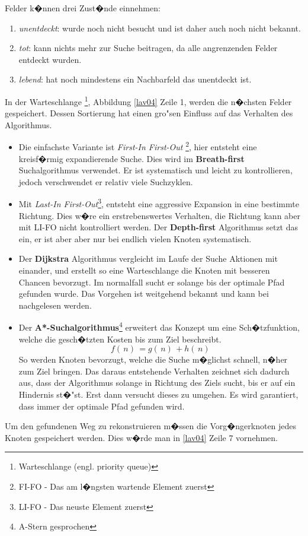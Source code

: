 Felder k�nnen drei Zust�nde einnehmen:
\begin{enumerate}

\item \textit{unentdeckt}: wurde noch nicht besucht und ist daher auch noch nicht bekannt.
\item \textit{tot}: kann nichts mehr zur Suche beitragen, da alle angrenzenden Felder entdeckt wurden.
\item \textit{lebend}: hat noch mindestens ein Nachbarfeld das unentdeckt ist.  
\end{enumerate} \cite[~S. 33]{Lav06}


In der Warteschlange \footnote{Warteschlange (engl. priority queue)}, Abbildung \ref{lav04} Zeile 1, werden die n�chsten Felder gespeichert. Dessen Sortierung hat einen gro"sen Einfluss auf das Verhalten des Algorithmus. 
	\begin{itemize}
		\item Die einfachste Variante ist \textit{First-In First-Out} \footnote{FI-FO - Das am l�ngsten wartende Element zuerst}, hier entsteht eine kreisf�rmig expandierende Suche. Dies wird im \textbf{Breath-first} Suchalgorithmus verwendet. Er ist systematisch und leicht zu kontrollieren, jedoch verschwendet er relativ viele Suchzyklen.\cite[~S. 35]{Lav06}
		\item Mit \textit{Last-In First-Out}\footnote{LI-FO - Das neuste Element zuerst}, entsteht eine aggressive Expansion in eine bestimmte Richtung. 
		Dies w�re ein erstrebenswertes Verhalten, die Richtung kann aber mit LI-FO nicht kontrolliert werden. Der \textbf{Depth-first} Algorithmus setzt das ein, er ist aber aber nur bei endlich vielen Knoten systematisch. \cite[~S. 36]{Lav06}
		\item Der \textbf{Dijkstra} Algorithmus vergleicht im Laufe der Suche Aktionen mit einander, und erstellt so eine Warteschlange die Knoten mit besseren Chancen bevorzugt. Im normalfall sucht er solange bis der optimale Pfad gefunden wurde. Das Vorgehen ist weitgehend bekannt und kann bei \cite[~S. 36]{Lav06} nachgelesen werden.
		\item Der \textbf{A*-Suchalgorithmus}\footnote{A-Stern gesprochen} erweitert das Konzept um eine Sch�tzfunktion, welche die gesch�tzten Kosten bis zum Ziel beschreibt.
		$$f( \, n ) \, = g ( \, n ) \, + h ( \, n ) \,$$
		So werden Knoten bevorzugt, welche die Suche m�glichst schnell, n�her zum Ziel bringen. Das daraus entstehende Verhalten zeichnet sich dadurch aus, dass der Algorithmus solange in Richtung des Ziels sucht, bis er auf ein Hindernis st�"st. Erst dann versucht dieses zu umgehen. Es wird garantiert, dass immer der optimale Pfad gefunden wird.\cite[~S. 37]{Lav06}
	\end{itemize}
Um den gefundenen Weg zu rekonstruieren m�ssen die Vorg�ngerknoten jedes Knoten gespeichert werden. Dies w�rde man in \ref{lav04} Zeile 7 vornehmen. 


